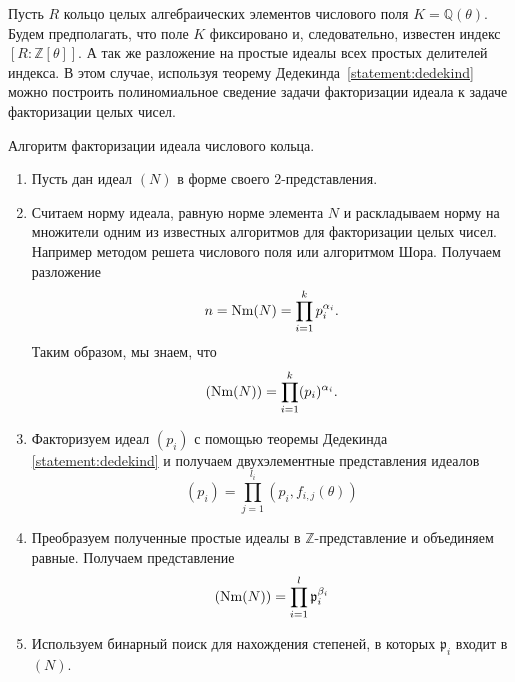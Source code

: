 \documentclass[_00_autoref.tex]{subfiles}
\begin{document}
Пусть $R$ кольцо целых алгебраических элементов числового поля $K = \mathbb{Q}(\theta)$.
Будем предполагать, что поле $K$ фиксировано и, следовательно, известен индекс $[R: \mathbb{Z}[\theta]]$.
А так же разложение на простые идеалы всех простых делителей индекса.
В этом случае, используя теорему Дедекинда~\ref{statement:dedekind} можно построить полиномиальное сведение задачи факторизации идеала к задаче факторизации целых чисел.

\begin{algorithm}
    Алгоритм факторизации идеала числового кольца.

    \begin{enumerate}
        \item Пусть дан идеал $(N)$ в форме своего $2$-представления.
        
        \item Считаем норму идеала, равную норме элемента $N$ и раскладываем норму на множители одним из известных алгоритмов для факторизации целых чисел.
        Например методом решета числового поля или алгоритмом Шора.
        Получаем разложение
        \begin{equation*}
            n = \textrm{Nm}(N) = \prod_{i=1}^{k} p_i^{\alpha_i}.
        \end{equation*}
        Таким образом, мы знаем, что
        \begin{equation*}
            (\textrm{Nm}(N)) = \prod_{i=1}^{k} (p_i)^{\alpha_i}.
        \end{equation*}
    
        \item Факторизуем идеал $(p_i)$ с помощью теоремы Дедекинда \ref{statement:dedekind} и получаем двухэлементные представления идеалов
        \begin{equation*}
            (p_i) = \prod_{j=1}^{l_i} (p_i, f_{i, j}(\theta))
        \end{equation*}
    
        \item Преобразуем полученные простые идеалы в $\mathbb{Z}$-представление и объединяем равные.
        Получаем представление
        \begin{equation*}
            (\textrm{Nm}(N)) = \prod_{i=1}^{l} \mathfrak{p}_i^{\beta_i}
        \end{equation*}
    
        \item Используем бинарный поиск для нахождения степеней, в которых $\mathfrak{p}_i$ входит в $(N)$.
    \end{enumerate}
\end{algorithm}
\end{document}
